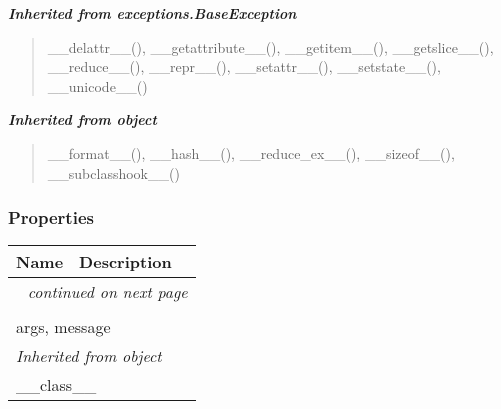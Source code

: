 \large{\textbf{\textit{Inherited from exceptions.BaseException}}}

\begin{quote}
\_\_delattr\_\_(), \_\_getattribute\_\_(), \_\_getitem\_\_(), \_\_getslice\_\_(), \_\_reduce\_\_(), \_\_repr\_\_(), \_\_setattr\_\_(), \_\_setstate\_\_(), \_\_unicode\_\_()
\end{quote}

\large{\textbf{\textit{Inherited from object}}}

\begin{quote}
\_\_format\_\_(), \_\_hash\_\_(), \_\_reduce\_ex\_\_(), \_\_sizeof\_\_(), \_\_subclasshook\_\_()
\end{quote}


  \subsubsection{Properties}

    \vspace{-1cm}
\hspace{\varindent}\begin{longtable}{|p{\varnamewidth}|p{\vardescrwidth}|l}
\cline{1-2}
\cline{1-2} \centering \textbf{Name} & \centering \textbf{Description}& \\
\cline{1-2}
\endhead\cline{1-2}\multicolumn{3}{r}{\small\textit{continued on next page}}\\\endfoot\cline{1-2}
\endlastfoot\multicolumn{2}{|l|}{\textit{Inherited from exceptions.BaseException}}\\
\multicolumn{2}{|p{\varwidth}|}{\raggedright args, message}\\
\cline{1-2}
\multicolumn{2}{|l|}{\textit{Inherited from object}}\\
\multicolumn{2}{|p{\varwidth}|}{\raggedright \_\_class\_\_}\\
\cline{1-2}
\end{longtable}



